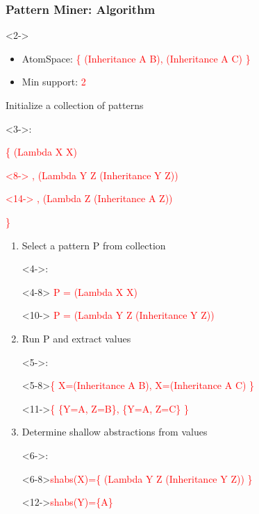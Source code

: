 \documentclass{beamer}
\begin{document}
\begin{frame}[fragile]
  \frametitle{Pattern Miner: Algorithm}

  {\tiny
    \begin{visibleenv}<2->
      \begin{itemize}
      \item AtomSpace: \textcolor{red}{\{ (Inheritance A B), (Inheritance A C) \}}
      \item Min support: \textcolor{red}{2}
      \end{itemize}
  \end{visibleenv}}
  
{\tiny Initialize a collection of patterns\begin{visibleenv}<3->:
    \textcolor{red}{\{ (Lambda X X)\begin{onlyenv}<8-> , (Lambda Y
        Z (Inheritance Y Z))\end{onlyenv}\begin{onlyenv}<14-> , (Lambda
        Z (Inheritance A Z))\end{onlyenv} \}}
  \end{visibleenv}
  
  \begin{enumerate}
  \item \alert{Select a pattern P} from collection\begin{onlyenv}<4->:\end{onlyenv}\begin{onlyenv}<4-8>
      \textcolor{red}{P = (Lambda X X)}
    \end{onlyenv}\begin{onlyenv}<10->
      \textcolor{red}{P = (Lambda Y Z (Inheritance Y Z))}
    \end{onlyenv}
  \item Run P and \alert{extract values}\begin{onlyenv}<5->:\end{onlyenv}
    \begin{onlyenv}<5-8>\textcolor{red}{\{ X=(Inheritance A B),
        X=(Inheritance A C) \}}
      \end{onlyenv}\begin{onlyenv}<11->\textcolor{red}{\{ \{Y=A, Z=B\},
        \{Y=A, Z=C\} \}}
      \end{onlyenv}
  \item Determine \alert{shallow abstractions} from
    values\begin{onlyenv}<6->:\end{onlyenv}
    \begin{onlyenv}<6-8>\textcolor{red}{shabs(X)=\{ (Lambda Y Z
        (Inheritance Y Z)) \}}
    \end{onlyenv}\begin{onlyenv}<12->\textcolor{red}{shabs(Y)=\{A\}}
    \end{onlyenv}


\end{enumerate}}
\end{frame}
\end{document}
